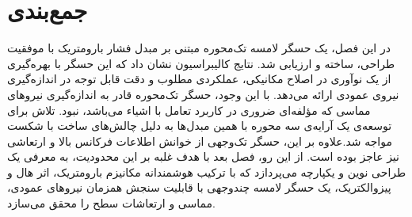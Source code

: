 \section{جمع‌بندی}
در این فصل، یک حسگر لامسه تک‌‌محوره مبتنی بر مبدل فشار بارومتریک با موفقیت طراحی، ساخته و ارزیابی شد. نتایج کالیبراسیون نشان داد که این حسگر با بهره‌گیری از یک نوآوری در اصلاح مکانیکی، عملکردی مطلوب و دقت قابل توجه در اندازه‌گیری نیروی عمودی ارائه می‌دهد. با این وجود، حسگر تک‌‌محوره قادر به اندازه‌گیری نیروهای مماسی که مؤلفه‌ای ضروری در کاربرد تعامل با اشیاء می‌باشد، نبود. تلاش برای توسعه‌ی یک آرایه‌ی سه محوره با همین مبدل‌ها به دلیل چالش‌های ساخت با شکست مواجه شد.علاوه بر این، حسگر تک‌وجهی از خوانش اطلاعات فرکانس بالا و ارتعاشی نیز عاجز بوده است. از این رو، فصل بعد با هدف غلبه بر این محدودیت، به معرفی یک طراحی نوین و یکپارچه می‌پردازد که با ترکیب هوشمندانه مکانیزم بارومتریک، اثر هال و پیزوالکتریک، یک حسگر لامسه چندوجهی با قابلیت سنجش همزمان نیروهای عمودی، مماسی و ارتعاشات سطح را محقق می‌سازد.

